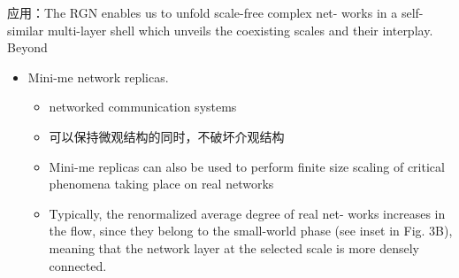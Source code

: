 应用：The RGN enables us to unfold scale-free complex net- works in a
self-similar multi-layer shell which unveils the coexisting scales and
their interplay. Beyond

\begin{itemize}
\item
  Mini-me network replicas.

  \begin{itemize}
  \item
    networked communication systems
  \item
    可以保持微观结构的同时，不破坏介观结构
  \item
    Mini-me replicas can also be used to perform finite size scaling of
    critical phenomena taking place on real networks
  \item
    Typically, the renormalized average degree of real net- works
    increases in the flow, since they belong to the small-world phase
    (see inset in Fig. 3B), meaning that the network layer at the
    selected scale is more densely connected.
  \end{itemize}
\end{itemize}